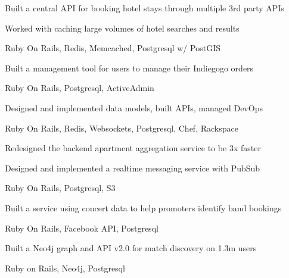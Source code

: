 \documentclass[]{modern}
\begin{document}
\begin{minipage}[t]{0.66\textwidth}

\begin{tightemize}
\item Built a central API for booking hotel stays through multiple 3rd party APIs
\item Worked with caching large volumes of hotel searches and results
\item Ruby On Rails, Redis, Memcached, Postgresql w/ PostGIS
\end{tightemize}
\sectionsep


\begin{tightemize}
\item Built a management tool for users to manage their Indiegogo orders
\item Ruby On Rails, Postgresql, ActiveAdmin
\end{tightemize}
\sectionsep


\begin{tightemize}
\item Designed and implemented data models, built APIs, managed DevOps
\item Ruby On Rails, Redis, Websockets, Postgresql, Chef, Rackspace
\end{tightemize}
\sectionsep


\begin{tightemize}
\item Redesigned the backend apartment aggregation service to be 3x faster
\item Designed and implemented a realtime messaging service with PubSub
\item Ruby On Rails, Postgresql, S3
\end{tightemize}
\sectionsep


\begin{tightemize}
\item Built a service using concert data to help promoters identify band bookings
\item Ruby On Rails, Facebook API, Postgresql
\end{tightemize}
\sectionsep


\begin{tightemize}
\item Built a Neo4j graph and API v2.0 for match discovery on 1.3m users
\item Ruby on Rails, Neo4j, Postgresql
\end{tightemize}
\sectionsep


\end{minipage}
\end{document}
